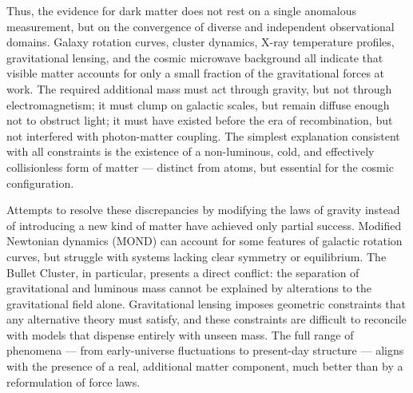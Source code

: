 Thus, the evidence for dark matter does not rest on a single anomalous measurement, but on the convergence of diverse and independent observational domains. Galaxy rotation curves, cluster dynamics, X-ray temperature profiles, gravitational lensing, and the cosmic microwave background all indicate that visible matter accounts for only a small fraction of the gravitational forces at work. The required additional mass must act through gravity, but not through electromagnetism; it must clump on galactic scales, but remain diffuse enough not to obstruct light; it must have existed before the era of recombination, but not interfered with photon-matter coupling. The simplest explanation consistent with all constraints is the existence of a non-luminous, cold, and effectively collisionless form of matter — distinct from atoms, but essential for the cosmic configuration.

Attempts to resolve these discrepancies by modifying the laws of gravity instead of introducing a new kind of matter have achieved only partial success. Modified Newtonian dynamics (MOND) can account for some features of galactic rotation curves, but struggle with systems lacking clear symmetry or equilibrium. The Bullet Cluster, in particular, presents a direct conflict: the separation of gravitational and luminous mass cannot be explained by alterations to the gravitational field alone. Gravitational lensing imposes geometric constraints that any alternative theory must satisfy, and these constraints are difficult to reconcile with models that dispense entirely with unseen mass. The full range of phenomena — from early-universe fluctuations to present-day structure — aligns with the presence of a real, additional matter component, much better than by a reformulation of force laws.

\newpage

\vspace{2em}


